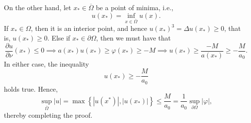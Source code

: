 \documentclass[10pt]{amsart}
\theoremstyle{thmstyle}
\theoremstyle{defstyle}
\renewcommand{\le}{\leqslant}
\renewcommand{\ge}{\geqslant}
\begin{document}
On the other hand, let $x_\ast\in\overline\Omega$ be a point of minima, i.e., 
\begin{equation*}
    u(x_\ast) = \inf_{x\in\overline\Omega} u(x).
\end{equation*}
If $x_\ast\in\Omega$, then it is an interior point, and hence $u(x_\ast)^3 = \Delta u(x_\ast)\ge 0$, that is, $u(x_\ast)\ge 0$. Else if $x_\ast\in\partial\Omega$, then we must have that 
\begin{equation*}
    \frac{\partial u }{\partial\nu}(x_\ast)\le 0\implies a(x_\ast)u(x_\ast)\ge\varphi(x_\ast)\ge -M\implies u(x_\ast)\ge\frac{-M}{a(x_\ast)}\ge-\frac{M}{a_0}.
\end{equation*}
In either case, the inequality 
\begin{equation*}
    u(x_\ast)\ge-\frac{M}{a_0}
\end{equation*}
holds true. Hence, 
\begin{equation*}
    \sup_{\overline\Omega} |u| = \max\left\{|u(x^\ast)|, |u(x_\ast)|\right\}\le\frac{M}{a_0} = \frac{1}{a_0}\sup_{\partial\Omega}|\varphi|,
\end{equation*}
thereby completing the proof.
\end{document}
